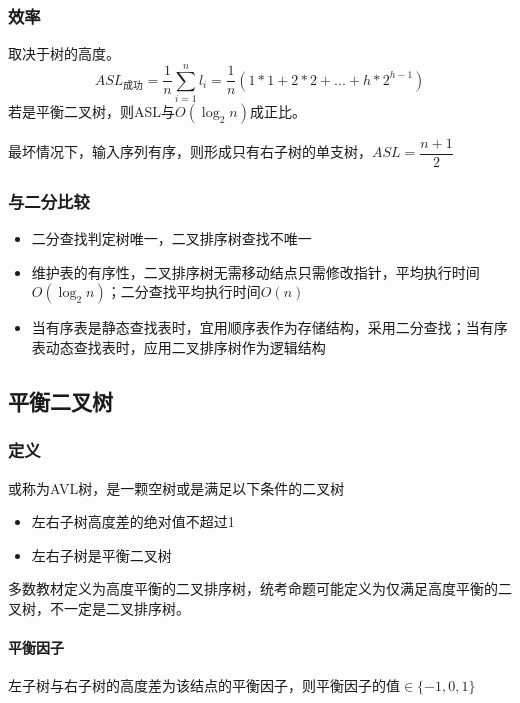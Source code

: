 \subsubsection{效率}
取决于树的高度。
\[ASL_{\text{成功}} = \dfrac{1}{n}\sum_{i = 1}^nl_i = \dfrac{1}{n}(1 * 1 + 2 * 2 + ... + h * 2^{h - 1})\]
若是平衡二叉树，则ASL与\(O(\log_2n)\)成正比。

最坏情况下，输入序列有序，则形成只有右子树的单支树，\(ASL = \dfrac{n + 1}{2}\)


\subsubsection{与二分比较}
\begin{itemize}
    \item 二分查找判定树唯一，二叉排序树查找不唯一
    \item 维护表的有序性，二叉排序树无需移动结点只需修改指针，平均执行时间\(O(\log_2n)\)；二分查找平均执行时间\(O(n)\)
    \item 当有序表是静态查找表时，宜用顺序表作为存储结构，采用二分查找；当有序表动态查找表时，应用二叉排序树作为逻辑结构
\end{itemize}


\subsection{平衡二叉树}

\subsubsection{定义}
或称为AVL树，是一颗空树或是满足以下条件的二叉树
\begin{itemize}
    \item 左右子树高度差的绝对值不超过1
    \item 左右子树是平衡二叉树
\end{itemize}

多数教材定义为高度平衡的二叉排序树，统考命题可能定义为仅满足高度平衡的二叉树，不一定是二叉排序树。


\paragraph{平衡因子}
左子树与右子树的高度差为该结点的平衡因子，则平衡因子的值\(\in \{-1, 0, 1\}\)


